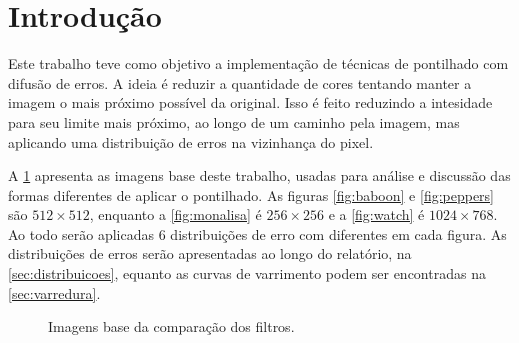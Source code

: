 \section{Introdução}

Este trabalho teve como objetivo a implementação de técnicas de pontilhado com difusão de erros. A ideia é reduzir a quantidade de cores tentando manter a imagem o mais próximo possível da original. Isso é feito reduzindo a intesidade para seu limite mais próximo, ao longo de um caminho pela imagem, mas aplicando uma distribuição de erros na vizinhança do pixel.

A \cref{fig:base} apresenta as imagens base deste trabalho, usadas para análise e discussão das formas diferentes de aplicar o pontilhado. As figuras \ref{fig:baboon} e \ref{fig:peppers} são $512 \times 512$, enquanto a \cref{fig:monalisa} é $256 \times 256$ e a \cref{fig:watch} é $1024 \times 768$. Ao todo serão aplicadas 6 distribuições de erro com  diferentes em cada figura. As distribuições de erros serão apresentadas ao longo do relatório, na \cref{sec:distribuicoes}, equanto as curvas de varrimento podem ser encontradas na \cref{sec:varredura}.

\begin{figure}[H]
    \centering
    

    \caption{Imagens base da comparação dos filtros.}
    \label{fig:base}
\end{figure}
